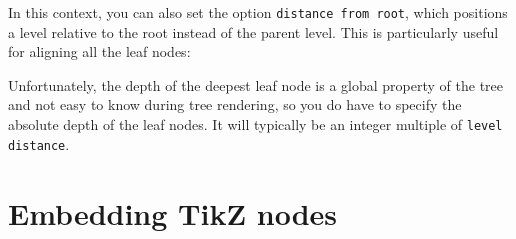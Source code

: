\documentclass{article}
\begin{document}
\begin{center}
\begin{SideBySideExample}
\end{SideBySideExample}
\end{center}

In this context, you can also set the option \verb|distance from root|, which positions a level relative to the root instead of the parent level. This is particularly useful for aligning all the leaf nodes:
\begin{center}
\begin{SideBySideExample}
\end{SideBySideExample}
\end{center}
Unfortunately, the depth of the deepest leaf node is a global property of the tree and not easy to know during tree rendering, so you do have to specify the absolute depth of the leaf nodes. It will typically be an integer multiple of \verb|level distance|.

\section{Embedding TikZ nodes}
\end{document}
